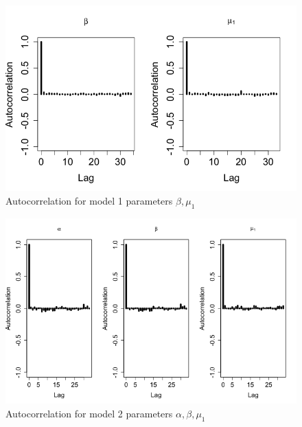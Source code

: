 \documentclass{asaproc}
\begin{document}
\begin{figure}
    \centering
    \includegraphics[scale = 0.6]{acf_m1.png}
    \caption{Autocorrelation for model 1 parameters $\beta, \mu_1$}
    \label{acf1}
\end{figure}


\begin{figure}
    \centering
    \includegraphics[scale = 0.7]{acf_m2.png}
    \caption{Autocorrelation for model 2 parameters $\alpha, \beta, \mu_1$}
    \label{acf2}
\end{figure}
\end{document}
